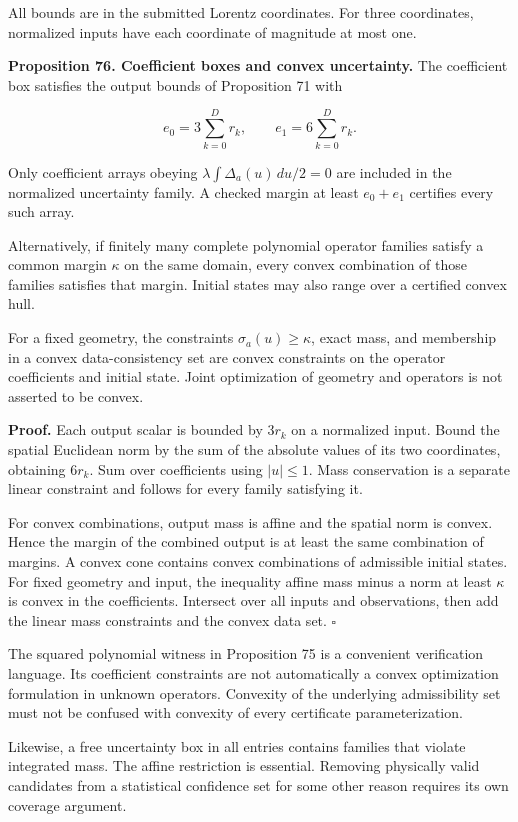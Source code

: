 \documentclass[11pt,letterpaper]{article}
\begin{document}
All bounds are in the submitted Lorentz coordinates. For three
coordinates, normalized inputs have each coordinate of magnitude at most
one.

\textbf{Proposition 76. Coefficient boxes and convex uncertainty.} The
coefficient box satisfies the output bounds of Proposition 71 with

\[
\boxed{e_0=3\sum_{k=0}^{D}r_k,\qquad e_1=6\sum_{k=0}^{D}r_k.}
\]

Only coefficient arrays obeying \(\lambda\int\Delta_a(u)\,du/2=0\) are
included in the normalized uncertainty family. A checked margin at least
\(e_0+e_1\) certifies every such array.

Alternatively, if finitely many complete polynomial operator families
satisfy a common margin \(\kappa\) on the same domain, every convex
combination of those families satisfies that margin. Initial states may
also range over a certified convex hull.

For a fixed geometry, the constraints \(\sigma_a(u)\geq\kappa\), exact
mass, and membership in a convex data-consistency set are convex
constraints on the operator coefficients and initial state. Joint
optimization of geometry and operators is not asserted to be convex.

\textbf{Proof.} Each output scalar is bounded by \(3r_k\) on a
normalized input. Bound the spatial Euclidean norm by the sum of the
absolute values of its two coordinates, obtaining \(6r_k\). Sum over
coefficients using \(|u|\leq1\). Mass conservation is a separate linear
constraint and follows for every family satisfying it.

For convex combinations, output mass is affine and the spatial norm is
convex. Hence the margin of the combined output is at least the same
combination of margins. A convex cone contains convex combinations of
admissible initial states. For fixed geometry and input, the inequality
affine mass minus a norm at least \(\kappa\) is convex in the
coefficients. Intersect over all inputs and observations, then add the
linear mass constraints and the convex data set. \(\square\)

The squared polynomial witness in Proposition 75 is a convenient
verification language. Its coefficient constraints are not automatically
a convex optimization formulation in unknown operators. Convexity of the
underlying admissibility set must not be confused with convexity of
every certificate parameterization.

Likewise, a free uncertainty box in all entries contains families that
violate integrated mass. The affine restriction is essential. Removing
physically valid candidates from a statistical confidence set for some
other reason requires its own coverage argument.
\end{document}
